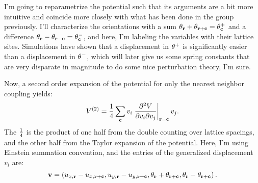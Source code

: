 \documentclass[12pt]{article}
\begin{document}
I'm going to reparametrize the potential such that its arguments are a bit more intuitive and coincide more closely with what has been done in the group previously. I'll characterize the orientations with a sum $\theta_{\mathbf{r}} + \theta_{\mathbf{r} + \mathbf{c}} = \theta^+_{\mathbf{c}}$ and a difference $\theta_{\mathbf{r}} - \theta_{\mathbf{r} - \mathbf{c}} = \theta^-_{\mathbf{c}}$, and here, I'm labeling the variables with their lattice sites. Simulations have shown that a displacement in $\theta^+$ is significantly easier than a displacement in $\theta^-$, which will later give us some spring constants that are very disparate in magnitude to do some nice perturbation theory, I'm sure.

Now, a second order expansion of the potential for only the nearest neighbor coupling yields:
\[ V^{(2)} = \frac{1}{4}\sum_{\mathbf{c}} v_i \left.\frac{\partial^2 V}{\partial v_i \partial v_j}\right|_{\mathbf{r} = \mathbf{c}} v_j.\]
The $\frac{1}{4}$ is the product of one half from the double counting over lattice spacings, and the other half from the Taylor expansion of the potential. Here, I'm using Einstein summation convention, and the entries of the generalized displacement $v_i$ are:
\[ \mathbf{v} = \left(u_{x,\mathbf{r}}-u_{x,\mathbf{r} + \mathbf{c}},u_{y,\mathbf{r}} - u_{y,\mathbf{r} + \mathbf{c}},\theta_{\mathbf{r}} + \theta_{\mathbf{r} + \mathbf{c}},\theta_{\mathbf{r}} - \theta_{\mathbf{r} + \mathbf{c}}\right).\]
\end{document}
